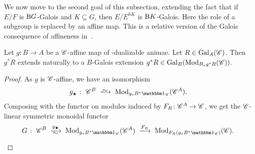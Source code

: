 \documentclass[english,svgnames,table]{article}
\begin{document}
    We now move to the second goal of this subsection, extending the fact that if $E / F$ is $\mathrm{B} G$-Galois and $K \subseteq G$, then $E / E^{hK}$ is $\mathrm{B} K$-Galois. Here the role of a subgroup is replaced by an affine map. This is a relative version of the Galois consequence of affineness in~\cite[Corollary~2.28]{BCSY-Fourier}.
    \begin{proposition}
    \label{thm:relative-subgroup}
        Let $g \colon B \to A$ be a $\mathscr{C}$-affine map of \CO-dualizable animae.
        Let $R\in\mathrm{Gal}_A(\mathscr{C})$. Then $g^* R$ extends naturally to a $B$-Galois extension $g^* R \in \mathrm{Gal}_B(\operatorname{Mod}_{B_* g^* R}(\mathscr{C}))$.
    \end{proposition}
    \begin{proof}
        As $g$ is $\mathscr{C}$-affine, we have an isomorphism
        \begin{equation*}
            g_{\scriptscriptstyle\bigstar} \;\colon\; \cC^B \;\isotoo\; \Mod_{g_* B^* \ounit_{\cC}}(\cC^A).
        \end{equation*}
        Composing with the functor on modules induced by $F_R \colon \mathscr{C}^A \to \mathscr{C}$, we get the $\mathscr{C}$-linear symmetric monoidal functor
        \begin{equation*}
            G \;\colon\; \cC^B \;\xisotoo{g_{\scriptscriptstyle\bigstar}}\; \Mod_{g_* B^* \ounit_{\cC}}(\cC^A) \;\xtoo{F_R}\; \Mod_{F_R(g_* B^* \ounit_{\cC})}(\cC).
        \end{equation*}
        

\end{proof}
\end{document}

